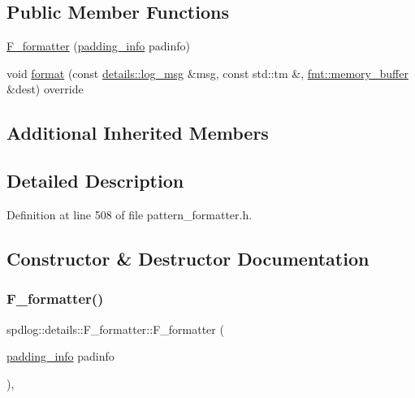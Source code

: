 \subsection*{Public Member Functions}
\begin{DoxyCompactItemize}
\item 
\hyperlink{classspdlog_1_1details_1_1_f__formatter_a932cd91a68880bfedd402ebf934ccd77}{F\+\_\+formatter} (\hyperlink{structspdlog_1_1details_1_1padding__info}{padding\+\_\+info} padinfo)
\item 
void \hyperlink{classspdlog_1_1details_1_1_f__formatter_a1ff6475bf808c73612748c55fe3883c2}{format} (const \hyperlink{structspdlog_1_1details_1_1log__msg}{details\+::log\+\_\+msg} \&msg, const std\+::tm \&, \hyperlink{format_8h_a21cbf729f69302f578e6db21c5e9e0d2}{fmt\+::memory\+\_\+buffer} \&dest) override
\end{DoxyCompactItemize}
\subsection*{Additional Inherited Members}


\subsection{Detailed Description}


Definition at line 508 of file pattern\+\_\+formatter.\+h.



\subsection{Constructor \& Destructor Documentation}
\mbox{\label{classspdlog_1_1details_1_1_f__formatter_a932cd91a68880bfedd402ebf934ccd77}} 
\subsubsection{\texorpdfstring{F\+\_\+formatter()}{F\_formatter()}}
{\footnotesize\ttfamily spdlog\+::details\+::\+F\+\_\+formatter\+::\+F\+\_\+formatter (\begin{DoxyParamCaption}\item[{\hyperlink{structspdlog_1_1details_1_1padding__info}{padding\+\_\+info}}]{padinfo }\end{DoxyParamCaption})\hspace{0.3cm}{\ttfamily [inline]}, {\ttfamily [explicit]}}



